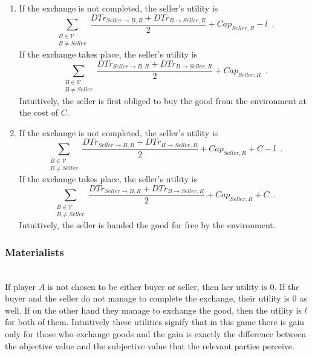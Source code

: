     \begin{enumerate}
      \item If the exchange is not completed, the seller's utility is 
      \begin{equation*}
        \sum\limits_{\substack{B \in \mathcal{V} \\ B \neq Seller}}\frac{DTr_{Seller \rightarrow B, R} + DTr_{B \rightarrow
	Seller, R}}{2} + Cap_{Seller, R} - l \enspace.
      \end{equation*}
      If the exchange takes place, the seller's utility is
      \begin{equation*}
        \sum\limits_{\substack{B \in \mathcal{V} \\ B \neq Seller}}\frac{DTr_{Seller \rightarrow B, R} + DTr_{B \rightarrow
	Seller, R}}{2} + Cap_{Seller, R} \enspace.
      \end{equation*}
      Intuitively, the seller is first obliged to buy the good from the environment at the cost of $C$.

      \item If the exchange is not completed, the seller's utility is
      \begin{equation*}
        \sum\limits_{\substack{B \in \mathcal{V} \\ B \neq Seller}}\frac{DTr_{Seller \rightarrow B, R} + DTr_{B \rightarrow
	Seller, R}}{2} + Cap_{Seller, R} + C - l \enspace.
      \end{equation*}
      If the exchange takes place, the seller's utility is
      \begin{equation*}
        \sum\limits_{\substack{B \in \mathcal{V} \\ B \neq Seller}}\frac{DTr_{Seller \rightarrow B, R} + DTr_{B \rightarrow
	Seller, R}}{2} + Cap_{Seller, R} + C \enspace.
      \end{equation*}
      Intuitively, the seller is handed the good for free by the environment.
    \end{enumerate}

  \subsubsection{Materialists} \ \\

    If player $A$ is not chosen to be either buyer or seller, then her utility is 0. If the buyer and the seller do not
    manage to complete the exchange, their utility is 0 as well. If on the other hand they manage to exchange the good, then
    the utility is $l$ for both of them. Intuitively these utilities signify that in this game there is gain only for those
    who exchange goods and the gain is exactly the difference between the objective value and the subjective value that the
    relevant parties perceive.

